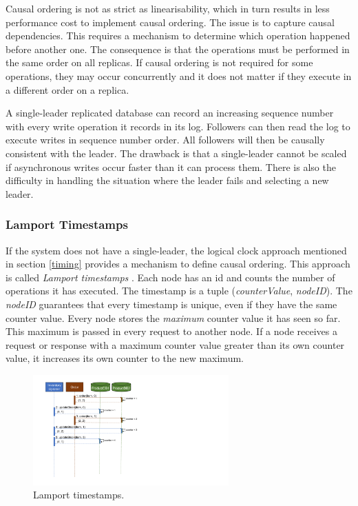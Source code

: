 Causal ordering is not as strict as linearisability, which in turn results in less performance cost to implement causal ordering.
The issue is to capture causal dependencies.
This requires a mechanism to determine which operation happened before another one.
The consequence is that the operations must be performed in the same order on all replicas.
If causal ordering is not required for some operations, they may occur concurrently
and it does not matter if they execute in a different order on a replica.

A single-leader replicated database can record an increasing sequence number with every write operation it records in its log.
Followers can then read the log to execute writes in sequence number order.
All followers will then be causally consistent with the leader.
The drawback is that a single-leader cannot be scaled if asynchronous writes occur faster than it can process them.
There is also the difficulty in handling the situation where the leader fails and selecting a new leader.

\subsubsection{Lamport Timestamps}
If the system does not have a single-leader, the logical clock approach mentioned in section \ref{timing} provides a mechanism to define causal ordering.
This approach is called \emph{Lamport timestamps} \cite{LamportLeslie1978Tcat}.
Each node has an id and counts the number of operations it has executed.
The timestamp is a tuple (\emph{counterValue}, \emph{nodeID}).
The \emph{nodeID} guarantees that every timestamp is unique, even if they have the same counter value.
Every node stores the \emph{maximum} counter value it has seen so far.
This maximum is passed in every request to another node.
If a node receives a request or response with a maximum counter value greater than its own counter value,
it increases its own counter to the new maximum.

\begin{figure}[h!]
    \centering
    \includegraphics[trim=60 189 450 35,clip,width=0.67\textwidth]{diagrams/lamport-timestamp-seq.png}
    \caption{Lamport timestamps.}
    \label{fig:lamport-timestamp-seq}
\end{figure}

